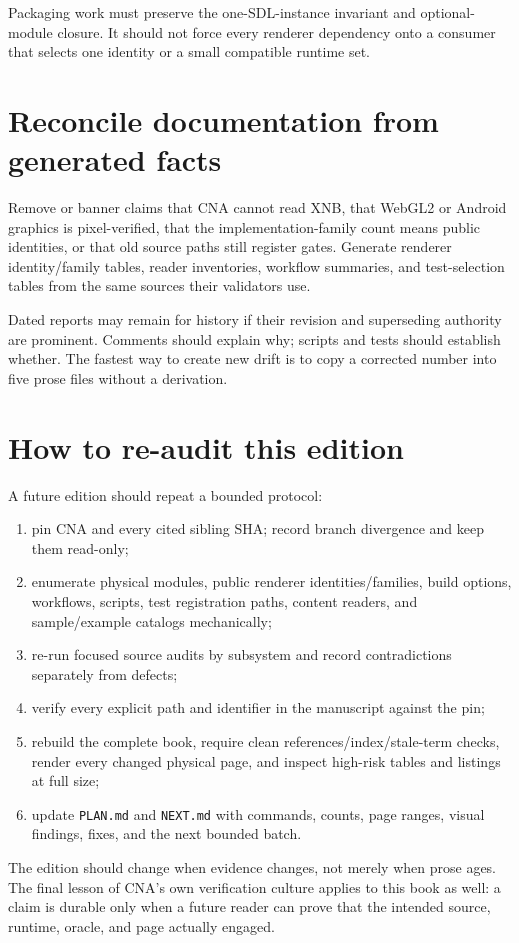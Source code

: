 Packaging work must preserve the one-SDL-instance invariant and optional-module closure.  It should
not force every renderer dependency onto a consumer that selects one identity or a small compatible
runtime set.

\section{Reconcile documentation from generated facts}

Remove or banner claims that CNA cannot read XNB, that WebGL2 or Android graphics is pixel-verified,
that the implementation-family count means public identities, or that old source paths still register gates.  Generate renderer
identity/family tables, reader inventories, workflow summaries, and test-selection tables from the
same sources their validators use.

Dated reports may remain for history if their revision and superseding authority are prominent.
Comments should explain why; scripts and tests should establish whether.  The fastest way to create
new drift is to copy a corrected number into five prose files without a derivation.

\section{How to re-audit this edition}

A future edition should repeat a bounded protocol:

\begin{enumerate}
  \item pin CNA and every cited sibling SHA; record branch divergence and keep them read-only;
  \item enumerate physical modules, public renderer identities/families, build options, workflows,
        scripts, test registration paths, content readers, and sample/example catalogs mechanically;
  \item re-run focused source audits by subsystem and record contradictions separately from defects;
  \item verify every explicit path and identifier in the manuscript against the pin;
  \item rebuild the complete book, require clean references/index/stale-term checks, render every
        changed physical page, and inspect high-risk tables and listings at full size;
  \item update \texttt{PLAN.md} and \texttt{NEXT.md} with commands, counts, page ranges, visual
        findings, fixes, and the next bounded batch.
\end{enumerate}

The edition should change when evidence changes, not merely when prose ages.  The final lesson of
CNA's own verification culture applies to this book as well: a claim is durable only when a future
reader can prove that the intended source, runtime, oracle, and page actually engaged.
